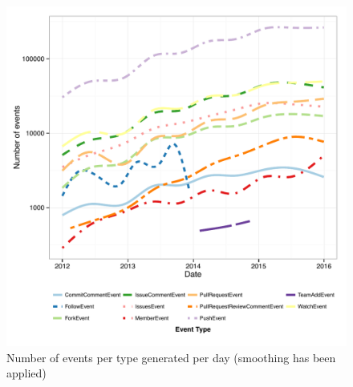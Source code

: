 \documentclass{sig-alternate}
\begin{document}
\begin{figure}
  \begin{center}
    \includegraphics[scale=0.5]{github-growth}
  \end{center}
  \caption{Number of events per type generated per day (smoothing has been
  applied)}
  \label{fig:growth}
\end{figure}
\end{document}

